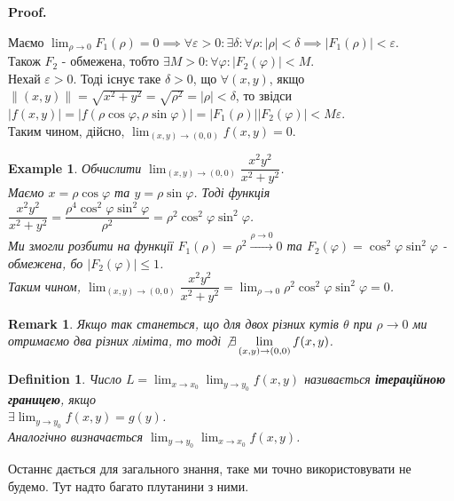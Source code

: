 \documentclass[a4paper, 10pt]{article}
\makeatletter
\def\huge{\displaystyle}
\def\qed{$\blacksquare$}
\theoremstyle{theoremdd}
\theoremstyle{theoremdd}
\theoremstyle{theoremdd}
\newtheorem{definition}[theorem]{Definition}
\theoremstyle{theoremdd}
\theoremstyle{theoremdd}
\newtheorem{example}[theorem]{Example}
\theoremstyle{theoremdd}
\theoremstyle{theoremdd}
\newtheorem{remark}[theorem]{Remark}
\theoremstyle{theoremdd}
\theoremstyle{theoremdd}
\renewenvironment{proof}[1][Proof.\\]{\par
\pushQED{\hfill \qed}%
\normalfont \topsep6\p@\@plus6\p@\relax
\trivlist
\item\relax
{\bfseries
#1\@addpunct{.}}\hspace\labelsep\ignorespaces
}{%
\popQED\endtrivlist\@endpefalse
}
\newcommand\Norm[1]{\lVert#1\rVert}
\makeatother
\begin{document}
\begin{proof}
Маємо $\huge\lim_{\rho \to 0} F_1(\rho) = 0 \implies \forall \varepsilon > 0: \exists \delta: \forall \rho: |\rho| < \delta \implies |F_1(\rho)| < \varepsilon$.\\
Також $F_2$ - обмежена, тобто $\exists M>0: \forall \varphi: |F_2(\varphi)| < M$.\\
Нехай $\varepsilon > 0$. Тоді існує таке $\delta > 0$, що $\forall (x,y)$, якщо $\Norm{(x,y)} = \sqrt{x^2+y^2} = \sqrt{\rho^2} = |\rho| < \delta$, то звідси $|f(x,y)| = |f(\rho \cos \varphi, \rho \sin \varphi)| = |F_1(\rho)| |F_2(\varphi)| < M\varepsilon$.\\
Таким чином, дійсно, $\huge\lim_{(x,y) \to (0,0)} f(x,y) = 0$.
\end{proof}

\begin{example}
Обчислити $\huge\lim_{(x,y) \to (0,0)} \dfrac{x^2y^2}{x^2+y^2}$.\\
Маємо $x = \rho \cos \varphi$ та $y = \rho \sin \varphi$. Тоді функція $\dfrac{x^2y^2}{x^2+y^2} = \dfrac{\rho^4 \cos^2 \varphi \sin^2 \varphi}{\rho^2} = \rho^2 \cos^2 \varphi \sin^2 \varphi$.\\
Ми змогли розбити на функції $F_1(\rho) = \rho^2 \overset{\rho \to 0}{\longrightarrow} 0$ та $F_2(\varphi) = \cos^2 \varphi \sin^2 \varphi$ - обмежена, бо $|F_2(\varphi)| \leq 1$.\\
Таким чином, $\huge\lim_{(x,y) \to (0,0)} \dfrac{x^2y^2}{x^2+y^2} = \lim_{\rho \to 0} \rho^2 \cos^2 \varphi \sin^2 \varphi = 0$.
\end{example}

\begin{remark}
Якщо так станеться, що для двох різних кутів $\theta$ при $\rho \to 0$ ми отримаємо два різних ліміта, то тоді $\not\exists \huge\lim_{(x,y) \to (0,0)} f(x,y)$.
\end{remark}

\begin{definition}
Число $L = \huge\lim_{x \to x_0} \lim_{y \to y_0} f(x,y)$ називається \textbf{ітераційною границею}, якщо \\ $\exists \huge\lim_{y \to y_0} f(x,y) = g(y)$.\\
Аналогічно визначається $\huge\lim_{y \to y_0} \lim_{x \to x_0} f(x,y)$.
\end{definition}
Останнє дається для загального знання, таке ми точно використовувати не будемо. Тут надто багато плутанини з ними.
\end{document}
